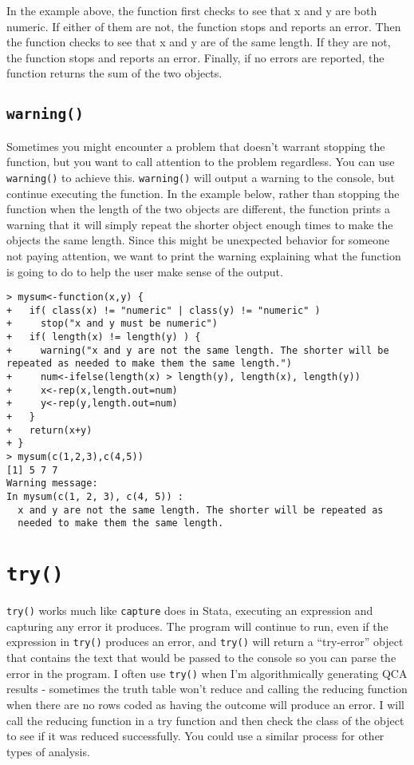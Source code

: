 \documentclass[12pt, oneside]{amsart}   	%
\begin{document}
In the example above, the function first checks to see that x and y are both numeric. If either of them are not, the function stops and reports an error. Then the function checks to see that x and y are of the same length. If they are not, the function stops and reports an error. Finally, if no errors are reported, the function returns the sum of the two objects.

\subsection{\texttt{warning()}}

Sometimes you might encounter a problem that doesn't warrant stopping the function, but you want to call attention to the problem regardless. You can use \texttt{warning()} to achieve this. \texttt{warning()} will output a warning to the console, but continue executing the function. In the example below, rather than stopping the function when the length of the two objects are different, the function prints a warning that it will simply repeat the shorter object enough times to make the objects the same length. Since this might be unexpected behavior for someone not paying attention, we want to print the warning explaining what the function is going to do to help the user make sense of the output.

\begin{verbatim}
> mysum<-function(x,y) {
+   if( class(x) != "numeric" | class(y) != "numeric" ) 
+     stop("x and y must be numeric")
+   if( length(x) != length(y) ) {
+     warning("x and y are not the same length. The shorter will be repeated as needed to make them the same length.")
+     num<-ifelse(length(x) > length(y), length(x), length(y))
+     x<-rep(x,length.out=num)
+     y<-rep(y,length.out=num)
+   }
+   return(x+y)
+ }
> mysum(c(1,2,3),c(4,5))
[1] 5 7 7
Warning message:
In mysum(c(1, 2, 3), c(4, 5)) :
  x and y are not the same length. The shorter will be repeated as 
  needed to make them the same length.
\end{verbatim}

\section{\texttt{try()}}

\texttt{try()} works much like \texttt{capture} does in Stata, executing an expression and capturing any error it produces. The program will continue to run, even if the expression in \texttt{try()} produces an error, and \texttt{try()} will return a ``try-error'' object that contains the text that would be passed to the console so you can parse the error in the program. I often use \texttt{try()} when I'm algorithmically generating QCA results - sometimes the truth table won't reduce and calling the reducing function when there are no rows coded as having the outcome will produce an error. I will call the reducing function in a try function and then check the class of the object to see if it was reduced successfully. You could use a similar process for other types of analysis.
\end{document}
